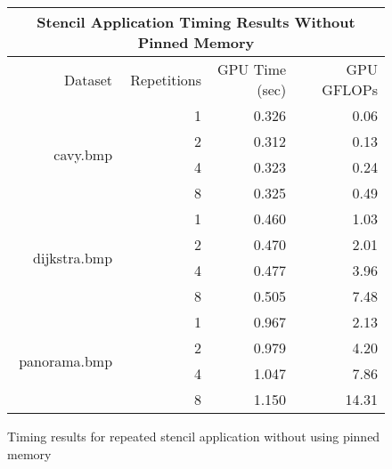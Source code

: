 \documentclass[a4paper]{article}
\begin{document}
\begin{figure}[h]
  \begin{tabular}{| r | r | r r |}
    \hline
    \multicolumn{4}{|c|}{Stencil Application Timing Results Without Pinned Memory} \\
    \hline
    Dataset & Repetitions & GPU Time (sec) & GPU GFLOPs \\
    \hline
    \multirow{4}{8em}{cavy.bmp} & 1 & 0.326 & 0.06 \\
    & 2 & 0.312 & 0.13 \\
    & 4 & 0.323 & 0.24 \\
    & 8 & 0.325 & 0.49 \\
    \hline
    \multirow{4}{8em}{dijkstra.bmp} & 1 & 0.460 & 1.03 \\
    & 2 & 0.470 & 2.01 \\
    & 4 & 0.477 & 3.96 \\
    & 8 & 0.505 & 7.48 \\
    \hline
    \multirow{4}{8em}{panorama.bmp} & 1 & 0.967 & 2.13 \\
    & 2 & 0.979 & 4.20 \\
    & 4 & 1.047 & 7.86 \\
    & 8 & 1.150 & 14.31 \\
    \hline
  \end{tabular}
  \caption{Timing results for repeated stencil application without using pinned memory}
  \label{fig:timing2}
\end{figure}
\end{document}
